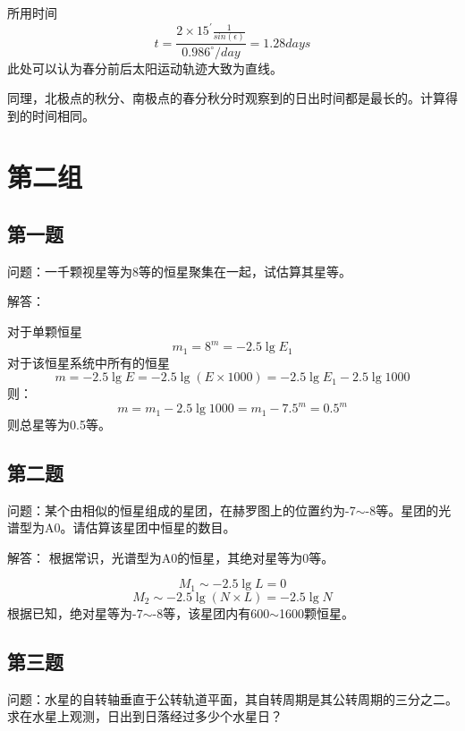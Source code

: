 \documentclass[a4paper,12pt]{report}
\begin{document}
所用时间
\begin{equation}
	t=\frac{2\times15^\prime\frac{1}{sin(\epsilon)}}{0.986^\circ/day}=1.28days
\end{equation}
此处可以认为春分前后太阳运动轨迹大致为直线。

同理，北极点的秋分、南极点的春分秋分时观察到的日出时间都是最长的。计算得到的时间相同。

\chapter{第二组}
\section{第一题}
\noindent 问题：一千颗视星等为8等的恒星聚集在一起，试估算其星等。

\noindent 解答：

对于单颗恒星
\begin{equation}
	m_{1}=8^m=-2.5\lg E_{1}
\end{equation}
对于该恒星系统中所有的恒星
\begin{equation}
	m=-2.5 \lg E=-2.5 \lg (E\times1000)=-2.5\lg E_{1}-2.5\lg 1000 
\end{equation}
则：
\begin{equation}
	m=m_{1}-2.5\lg 1000=m_{1}-7.5^m=0.5^m
\end{equation}
则总星等为0.5等。

\section{第二题}
\noindent 问题：某个由相似的恒星组成的星团，在赫罗图上的位置约为-7$\sim$-8等。星团的光谱型为A0。请估算该星团中恒星的数目。

\noindent 解答：
根据常识，光谱型为A0的恒星，其绝对星等为0等。

\begin{equation}
	M_{1}\sim -2.5 \lg L=0
\end{equation}
\begin{equation}
	M_{2}\sim -2.5\lg(N\times L)=-2.5\lg N
\end{equation}
根据已知，绝对星等为-7$\sim$-8等，该星团内有600$\sim$1600颗恒星。
\section{第三题}
\noindent 问题：水星的自转轴垂直于公转轨道平面，其自转周期是其公转周期的三分之二。求在水星上观测，日出到日落经过多少个水星日？
\end{document}
